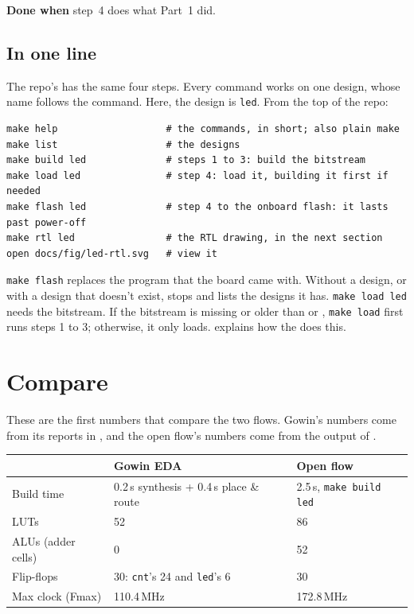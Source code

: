 \documentclass[11pt,a4paper]{article}
\begin{document}
\textbf{Done when} step~4 does what Part~1 did.

\subsection*{In one line}

The repo’s  has the same four steps. Every command works on one design, whose name follows the command. Here, the design is \texttt{led}. From the top of the repo:

\begin{verbatim}
make help                   # the commands, in short; also plain make
make list                   # the designs
make build led              # steps 1 to 3: build the bitstream
make load led               # step 4: load it, building it first if needed
make flash led              # step 4 to the onboard flash: it lasts past power-off
make rtl led                # the RTL drawing, in the next section
open docs/fig/led-rtl.svg   # view it
\end{verbatim}

\texttt{make flash} replaces the program that the board came with. Without a design, or with a design that doesn’t exist,  stops and lists the designs it has. \texttt{make load led} needs the bitstream. If the bitstream is missing or older than  or , \texttt{make load} first runs steps 1 to 3; otherwise, it only loads.  explains how the  does this.

\section*{Compare}\label{sec:compare}

These are the first numbers that compare the two flows. Gowin’s numbers come from its reports in , and the open flow’s numbers come from the output of .

\begin{center}
\begin{tabular}{lll}
  \toprule
  & Gowin EDA & Open flow \\
  \midrule
  Build time & 0.2\,s synthesis + 0.4\,s place \& route & 2.5\,s, \texttt{make build led} \\
  LUTs & 52 & 86 \\
  ALUs (adder cells) & 0 & 52 \\
  Flip-flops & 30: \texttt{cnt}’s 24 and \texttt{led}’s 6 & 30 \\
  Max clock (Fmax) & 110.4\,MHz & 172.8\,MHz \\
  \bottomrule
\end{tabular}
\end{center}
\end{document}

